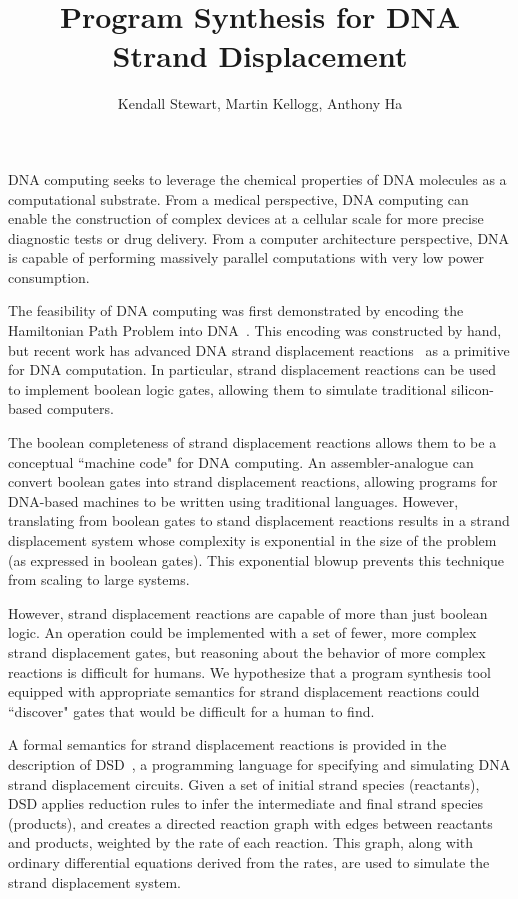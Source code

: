 \documentclass{article}
\begin{document}
\title{Program Synthesis for DNA Strand Displacement}
\author{Kendall Stewart, Martin Kellogg, Anthony Ha}

\maketitle

DNA computing seeks to leverage the chemical properties
of DNA molecules as a computational substrate.
From a medical perspective, DNA computing can enable the
construction of complex devices at a cellular scale for more precise
diagnostic tests or drug delivery. From a computer architecture perspective,
DNA is capable of performing massively parallel computations with very low
power consumption.

The feasibility of DNA computing was first demonstrated by encoding
the Hamiltonian Path Problem into DNA~\cite{adelman}.
This encoding was constructed by
hand, but recent work has advanced DNA strand displacement
reactions~\cite{strands} as a primitive for DNA computation. In particular,
strand displacement reactions can be used to implement boolean logic gates,
allowing them to simulate traditional silicon-based computers.

The boolean completeness of strand displacement reactions allows them to be
a conceptual ``machine code" for DNA computing. An assembler-analogue
can convert boolean gates into strand displacement reactions, allowing
programs for DNA-based machines to be written using traditional languages.
However, translating from boolean gates to stand displacement reactions
results in a strand displacement system whose complexity is exponential in the
size of the problem (as expressed in boolean gates). This exponential blowup
prevents this technique from scaling to large systems.

However, strand displacement reactions are capable of more than just boolean
logic. An operation could be implemented with a set of fewer, more
complex strand displacement gates, but reasoning about the behavior of more
complex reactions is difficult for humans.
We hypothesize that a program synthesis tool
equipped with appropriate semantics for strand displacement reactions could
``discover" gates that would be difficult for a human to find.

A formal semantics for strand displacement reactions is provided in the
description of DSD~\cite{dsd}, a programming language for specifying and
simulating DNA strand displacement circuits. Given a set of initial strand
species (reactants), DSD applies reduction rules to infer the intermediate and
final strand species (products), and creates a directed reaction graph with
edges between reactants and products, weighted by the rate of each reaction.
This graph, along with ordinary differential equations derived from the rates,
are used to simulate the strand displacement system.
\end{document}
